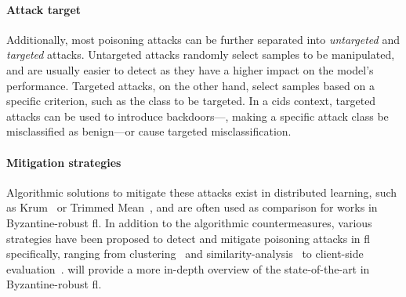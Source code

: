 \paragraph{Attack target}

Additionally, most poisoning attacks can be further separated into \emph{untargeted} and \emph{targeted} attacks.
Untargeted attacks randomly select samples to be manipulated, and are usually easier to detect as they have a higher impact on the model's performance.
Targeted attacks, on the other hand, select samples based on a specific criterion, such as the class to be targeted.
In a \gls{cids} context, targeted attacks can be used to introduce backdoors---\ie, making a specific attack class be misclassified as benign---or cause targeted misclassification.


\paragraph{Mitigation strategies}

Algorithmic solutions to mitigate these attacks exist in distributed learning, such as Krum~\cite{blanchard_Machinelearningadversaries_2017} or Trimmed Mean~\cite{yin_ByzantineRobustDistributedLearning_2018}, and are often used as comparison for works in Byzantine-robust \gls{fl}.
In addition to the algorithmic countermeasures, various strategies have been proposed to detect and mitigate poisoning attacks in \gls{fl} specifically, ranging from clustering~\cite{shen_Aurordefendingpoisoning_2016,nguyen_FLAMETamingBackdoors_2022} and similarity-analysis~\cite{fung_LimitationsFederatedLearning_2020,awan_CONTRADefendingPoisoning_2021} to client-side evaluation~\cite{zhao_ShieldingCollaborativeLearning_2020}.
 will provide a more in-depth overview of the state-of-the-art in Byzantine-robust \gls{fl}.